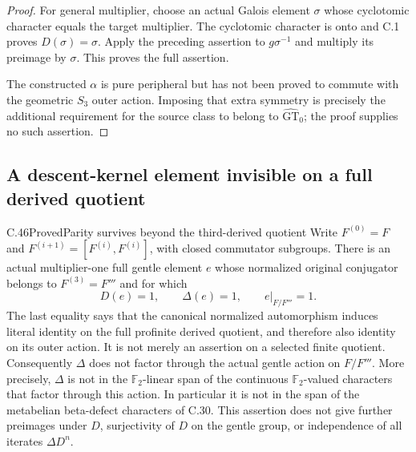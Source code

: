 \begin{proof}
For general multiplier, choose an actual Galois element $\sigma$
whose cyclotomic character equals the target multiplier. The
cyclotomic character is onto and C.1 proves $D(\sigma)=\sigma$.
Apply the preceding assertion to $g\sigma^{-1}$ and multiply its
preimage by $\sigma$. This proves the full assertion.

The constructed $\alpha$ is pure peripheral but has not been
proved to commute with the geometric $S_3$ outer action. Imposing
that extra symmetry is precisely the additional requirement for
the source class to belong to $\widehat{\mathrm{GT}}_0$; the
proof supplies no such assertion.
\end{proof}


\subsection{A descent-kernel element invisible on a full derived quotient}

\begin{statement}{C.46}{Proved}{Parity survives beyond the third-derived quotient}
Write $F^{(0)}=F$ and $F^{(i+1)}=[F^{(i)},F^{(i)}]$, with
closed commutator subgroups. There is an actual multiplier-one full
gentle element $e$ whose normalized original conjugator belongs to
$F^{(3)}=F'''$ and for which
\[
 D(e)=1,\qquad \Delta(e)=1,\qquad
 e|_{F/F'''}=1.                                      \tag{C.46.1}
\]
The last equality says that the canonical normalized automorphism induces
literal identity on the full profinite derived quotient, and therefore
also identity on its outer action. It is not merely an assertion on a
selected finite quotient. Consequently $\Delta$ does not factor through
the actual gentle action on $F/F'''$. More precisely, $\Delta$ is not
in the $\mathbb F_2$-linear span of the continuous $\mathbb F_2$-valued
characters that factor through this action. In particular it is not
in the span of the metabelian beta-defect characters
of C.30. This assertion does not give further preimages under $D$,
surjectivity of $D$ on the gentle group, or independence of all iterates
$\Delta D^n$.
\end{statement}

